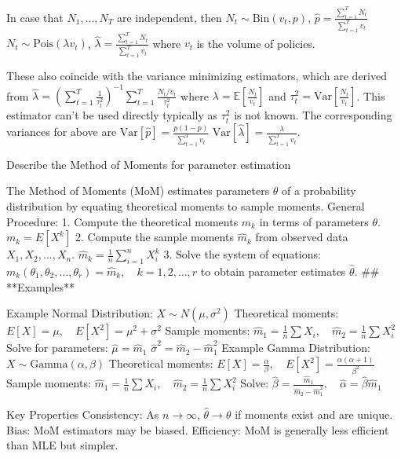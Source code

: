 In case that \( N_1, \dots, N_T \) are independent, then
\( N_t \sim \text{Bin}(v_t, p) \), \( \hat{p} = \frac{\sum_{t=1}^T N_t}{\sum_{t=1}^T v_t} \)
\( N_t \sim \text{Pois}(\lambda v_t) \), \( \hat{\lambda} = \frac{\sum_{t=1}^T N_t}{\sum_{t=1}^T v_t} \)
where \( v_t \) is the volume of policies.

These also coincide with the variance minimizing estimators, which are derived from
\( \hat{\lambda} = \left(\sum_{t = 1}^T \frac{1}{\tau^2_t}\right)^{-1}\sum_{t=1}^T \frac{N_t/v_t}{\tau^2_t} \)
where \( \lambda = \mathbb{E}[\frac{N_t}{v_t}] \) and \( \tau_t^2 = \text{Var}[\frac{N_t}{v_t}] \).
This estimator can't be used directly typically as \( \tau_t^2 \) is not known. 
The corresponding variances for above are
\( \text{Var}[\hat{p}] = \frac{p(1-p)}{\sum_{t=1}^T v_t} \)
\( \text{Var}[\hat{\lambda}] = \frac{\lambda}{\sum_{t=1}^T v_t} \).



Describe the Method of Moments for parameter estimation

The Method of Moments (MoM) estimates parameters \(\theta\) of a probability distribution by equating theoretical moments to sample moments.  
General Procedure:
1. Compute the theoretical moments \( m_k \) in terms of parameters \( \theta \).  
\(
m_k = E[X^k]
\)
2. Compute the sample moments \( \hat{m}_k \) from observed data \( X_1, X_2, ..., X_n \).  
\(
\hat{m}_k = \frac{1}{n} \sum_{i=1}^{n} X_i^k
\)
3. Solve the system of equations: 
\(m_k(\theta_1, \theta_2, \dots, \theta_r) = \hat{m}_k, \quad k = 1, 2, \dots, r\) 
to obtain parameter estimates \( \hat{\theta} \).
## **Examples**  

Example Normal Distribution:
\( X \sim N(\mu, \sigma^2) \)  
Theoretical moments:  
\(
E[X] = \mu, \quad E[X^2] = \mu^2 + \sigma^2
\)
Sample moments:  
\(
\hat{m}_1 = \frac{1}{n} \sum X_i, \quad \hat{m}_2 = \frac{1}{n} \sum X_i^2
\)
Solve for parameters:  
\(
\hat{\mu} = \hat{m}_1
\)
\(
\hat{\sigma}^2 = \hat{m}_2 - \hat{m}_1^2
\)
Example Gamma Distribution:
\( X \sim \text{Gamma}(\alpha, \beta) \)  
Theoretical moments:  
\(
E[X] = \frac{\alpha}{\beta}, \quad E[X^2] = \frac{\alpha(\alpha+1)}{\beta^2}
\)
Sample moments:  
\(
\hat{m}_1 = \frac{1}{n} \sum X_i, \quad \hat{m}_2 = \frac{1}{n} \sum X_i^2
\)
Solve:  
\(
\hat{\beta} = \frac{\hat{m}_1}{\hat{m}_2 - \hat{m}_1^2}, \quad \hat{\alpha} = \hat{\beta} \hat{m}_1
\)

Key Properties
Consistency: As \( n \to \infty \), \( \hat{\theta} \to \theta \) if moments exist and are unique.  
Bias: MoM estimators may be biased.  
Efficiency: MoM is generally less efficient than MLE but simpler.  


